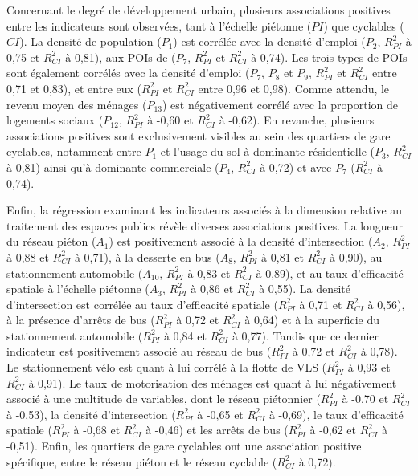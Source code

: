 \begin{refsegment}
Concernant le degré de développement urbain, plusieurs associations positives entre les indicateurs sont observées, tant à l'échelle piétonne (\(PI\)) que cyclables (\(CI\)). La densité de population (\(P_{1}\)) est corrélée avec la densité d'emploi (\(P_{2}\), \(R^{2}_{PI}\) à 0,75 et \(R^{2}_{CI}\) à 0,81), aux \acrshort{POIs} de  (\(P_{7}\), \(R^{2}_{PI}\) et \(R^{2}_{CI}\) à 0,74). Les trois types de \acrshort{POIs} sont également corrélés avec la densité d'emploi (\(P_{7}\), \(P_{8}\) et \(P_{9}\), \(R^{2}_{PI}\) et \(R^{2}_{CI}\) entre 0,71 et 0,83), et entre eux (\(R^{2}_{PI}\) et \(R^{2}_{CI}\) entre 0,96 et 0,98). Comme attendu, le revenu moyen des ménages (\(P_{13}\)) est négativement corrélé avec la proportion de logements sociaux (\(P_{12}\), \(R^{2}_{PI}\) à -0,60 et \(R^{2}_{CI}\) à -0,62). En revanche, plusieurs associations positives sont exclusivement visibles au sein des quartiers de gare cyclables, notamment entre \(P_{1}\) et l'usage du sol à dominante résidentielle (\(P_{3}\), \(R^{2}_{CI}\) à 0,81) ainsi qu'à dominante commerciale (\(P_{4}\), \(R^{2}_{CI}\) à 0,72) et avec \(P_{7}\) (\(R^{2}_{CI}\) à 0,74).%

Enfin, la régression examinant les indicateurs associés à la dimension relative au traitement des espaces publics révèle diverses associations positives. La longueur du réseau piéton (\(A_{1}\)) est positivement associé à la densité d'intersection (\(A_{2}\), \(R^{2}_{PI}\) à 0,88 et \(R^{2}_{CI}\) à 0,71), à la desserte en bus (\(A_{8}\), \(R^{2}_{PI}\) à 0,81 et \(R^{2}_{CI}\) à 0,90), au stationnement automobile (\(A_{10}\), \(R^{2}_{PI}\) à 0,83 et \(R^{2}_{CI}\) à 0,89), et au taux d'efficacité spatiale à l'échelle piétonne (\(A_{3}\), \(R^{2}_{PI}\) à 0,86 et \(R^{2}_{CI}\) à 0,55). La densité d'intersection est corrélée au taux d'efficacité spatiale (\(R^{2}_{PI}\) à 0,71 et \(R^{2}_{CI}\) à 0,56), à la présence d'arrêts de bus (\(R^{2}_{PI}\) à 0,72 et \(R^{2}_{CI}\) à 0,64) et à la superficie du stationnement automobile (\(R^{2}_{PI}\) à 0,84 et \(R^{2}_{CI}\) à 0,77). Tandis que ce dernier indicateur est positivement associé au réseau de bus (\(R^{2}_{PI}\) à 0,72 et \(R^{2}_{CI}\) à 0,78). Le stationnement vélo est quant à lui corrélé à la flotte de \acrshort{VLS} (\(R^{2}_{PI}\) à 0,93 et \(R^{2}_{CI}\) à 0,91). Le taux de motorisation des ménages est quant à lui négativement associé à une multitude de variables, dont le réseau piétonnier (\(R^{2}_{PI}\) à -0,70 et \(R^{2}_{CI}\) à -0,53), la densité d'intersection (\(R^{2}_{PI}\) à -0,65 et \(R^{2}_{CI}\) à -0,69), le taux d'efficacité spatiale (\(R^{2}_{PI}\) à -0,68 et \(R^{2}_{CI}\) à -0,46) et les arrêts de bus (\(R^{2}_{PI}\) à -0,62 et \(R^{2}_{CI}\) à -0,51). Enfin, les quartiers de gare cyclables ont une association positive spécifique, entre le réseau piéton et le réseau cyclable (\(R^{2}_{CI}\) à 0,72).


\end{refsegment}
